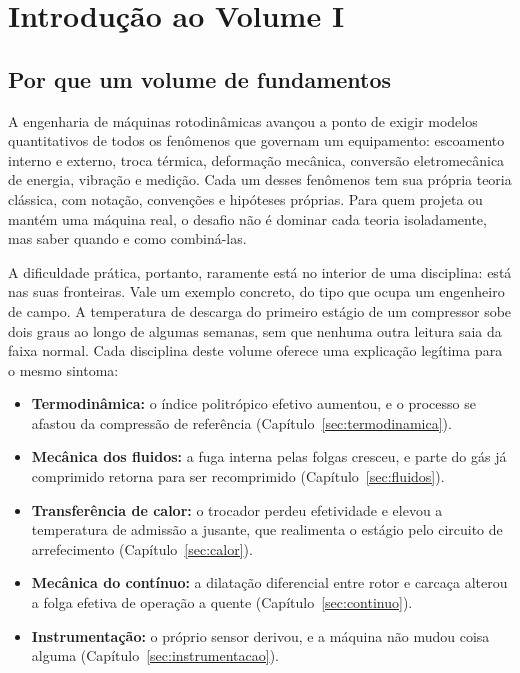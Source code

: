 \documentclass[12pt,a4paper]{article}
\numberwithin{equation}{section}
\numberwithin{table}{section}
\numberwithin{figure}{section}
\begin{document}
\section{Introdução ao Volume I}

\subsection{Por que um volume de fundamentos}

A engenharia de máquinas rotodinâmicas avançou a ponto de exigir modelos
quantitativos de todos os fenômenos que governam um equipamento: escoamento
interno e externo, troca térmica, deformação mecânica, conversão
eletromecânica de energia, vibração e medição. Cada um desses fenômenos tem
sua própria teoria clássica, com notação, convenções e hipóteses próprias.
Para quem projeta ou mantém uma máquina real, o desafio não é dominar cada
teoria isoladamente, mas saber quando e como combiná-las.

A dificuldade prática, portanto, raramente está no interior de uma disciplina:
está nas suas fronteiras. Vale um exemplo concreto, do tipo que ocupa um
engenheiro de campo. A temperatura de descarga do primeiro estágio de um
compressor sobe dois graus ao longo de algumas semanas, sem que nenhuma outra
leitura saia da faixa normal. Cada disciplina deste volume oferece uma
explicação legítima para o mesmo sintoma:

\begin{itemize}
	\item \textbf{Termodinâmica:} o índice politrópico efetivo aumentou, e o
	processo se afastou da compressão de referência
	(Capítulo~\ref{sec:termodinamica}).
	\item \textbf{Mecânica dos fluidos:} a fuga interna pelas folgas cresceu, e
	parte do gás já comprimido retorna para ser recomprimido
	(Capítulo~\ref{sec:fluidos}).
	\item \textbf{Transferência de calor:} o trocador perdeu efetividade e
	elevou a temperatura de admissão a jusante, que realimenta o estágio pelo
	circuito de arrefecimento (Capítulo~\ref{sec:calor}).
	\item \textbf{Mecânica do contínuo:} a dilatação diferencial entre rotor e
	carcaça alterou a folga efetiva de operação a quente
	(Capítulo~\ref{sec:continuo}).
	\item \textbf{Instrumentação:} o próprio sensor derivou, e a máquina não
	mudou coisa alguma (Capítulo~\ref{sec:instrumentacao}).
\end{itemize}
\end{document}
